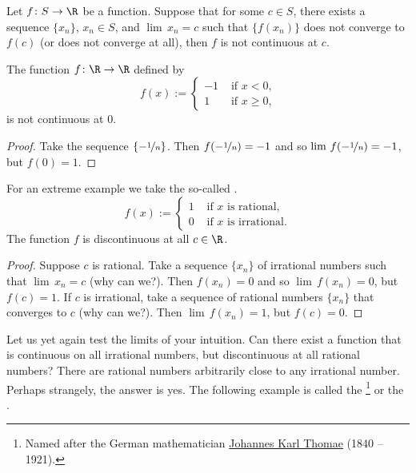 \documentclass[12pt]{book}
\begin{document}
\begin{prop}
Let $f \colon S \to \R$ be a function.
Suppose that for some $c \in S$,
there exists a sequence $\{ x_n \}$, $x_n \in S$, and $\lim\, x_n = c$
such that $\{ f(x_n) \}$ does not converge to $f(c)$ (or does not
converge at all), then $f$ is not
continuous at $c$.
\end{prop}

\begin{example} \label{example:stepdiscont}
The function $f \colon \R \to \R$ defined by
\begin{equation*}
f(x) := 
\begin{cases}
-1 & \text{ if $x < 0$,} \\
1 & \text{ if $x \geq 0$,}
\end{cases}
\end{equation*}
is not continuous at 0.

\begin{proof} Take the sequence $\{ - \nicefrac{1}{n} \}$.
Then
$f(-\nicefrac{1}{n}) = -1$
and so
$\lim\, f(-\nicefrac{1}{n}) = -1$, but $f(0) = 1$.
\end{proof}
\end{example}

\begin{example}
For an extreme example we take the so-called
\emph{}.
\begin{equation*}
f(x) :=
\begin{cases}
1 & \text{ if $x$ is rational,} \\
0 & \text{ if $x$ is irrational.}
\end{cases}
\end{equation*}
The function $f$ is discontinuous at all $c \in \R$.

\begin{proof}
Suppose $c$ is rational.
Take a sequence $\{ x_n \}$
of irrational numbers such that $\lim\, x_n = c$ (why can we?).
Then $f(x_n) = 0$
and so $\lim\, f(x_n) = 0$, but $f(c) = 1$.
If $c$ is irrational, take a sequence of rational numbers $\{ x_n \}$
that converges to $c$ (why can we?).
Then $\lim\, f(x_n) = 1$, but $f(c) = 0$.
\end{proof}
\end{example}

Let us yet again test the limits of your intuition.
Can
there exist a function that is continuous on all irrational numbers, but
discontinuous at all rational numbers?
  There are rational numbers
arbitrarily close to any irrational number.
Perhaps strangely, the
answer is yes.
The following example is called the
\emph{}\footnote{Named after the German
mathematician
\href{http://en.wikipedia.org/wiki/Thomae}{Johannes Karl Thomae}
(1840 -- 1921).} or the
\emph{}.
\end{document}
